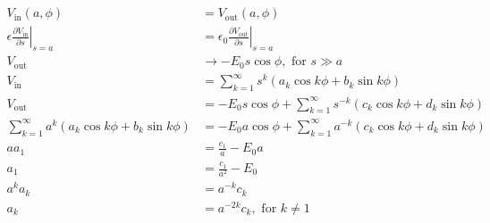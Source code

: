 \documentclass{article}
\begin{document}
\subsection{}

\begin{align*}
  V_\text{in}(a, \phi)                                                                        & = V_\text{out}(a, \phi)                                                                                             \\
  \epsilon \left. \frac{\partial V_\text{in}}{\partial s} \right|_{s = a}                     & = \epsilon_0 \left. \frac{\partial V_\text{out}}{\partial s} \right|_{s = a}                                        \\
  V_\text{out}                                                                                & \rightarrow -E_0 s \cos \phi, \text{ for } s \gg a                                                                  \\
  V_\text{in}                                                                                 & = \sum_{k = 1}^\infty s^k (a_k \cos k \phi + b_k \sin k \phi)                                                       \\
  V_\text{out}                                                                                & = -E_0 s \cos \phi + \sum_{k = 1}^\infty s^{-k} (c_k \cos k \phi + d_k \sin k \phi)                                 \\
  \sum_{k = 1}^\infty a^k (a_k \cos k \phi + b_k \sin k \phi)                                 & = -E_0 a \cos \phi + \sum_{k = 1}^\infty a^{-k} (c_k \cos k \phi + d_k \sin k \phi)                                 \\
  a a_1                                                                                       & = \frac{c_1}{a} - E_0 a                                                                                             \\
  a_1                                                                                         & = \frac{c_1}{a^2} - E_0                                                                                             \\
  a^k a_k                                                                                     & = a^{-k} c_k                                                                                                        \\
  a_k                                                                                         & = a^{-2 k} c_k, \text{ for } k \ne 1                                                                                \\

\end{align*}
\end{document}
